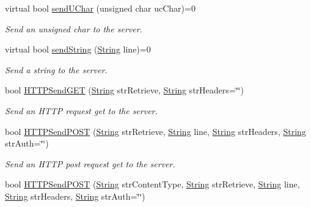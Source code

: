 \begin{DoxyCompactItemize}
virtual bool \mbox{\hyperlink{class_rad_j_a_v_1_1_networking_1_1_tcpip_client_a27e9adfc9d218a82cca52bdbe50c8ebf}{send\+U\+Char}} (unsigned char uc\+Char)=0
\begin{DoxyCompactList}\small\item\em Send an unsigned char to the server. \end{DoxyCompactList}\item 
virtual bool \mbox{\hyperlink{class_rad_j_a_v_1_1_networking_1_1_tcpip_client_abb5360e05cb078ed7cdc42bc70ffc3ab}{send\+String}} (\mbox{\hyperlink{class_rad_j_a_v_1_1_string}{String}} line)=0
\begin{DoxyCompactList}\small\item\em Send a string to the server. \end{DoxyCompactList}\item 
bool \mbox{\hyperlink{class_rad_j_a_v_1_1_networking_1_1_tcpip_client_a91ea7348351c25b23e318088f3dad2a8}{H\+T\+T\+P\+Send\+G\+ET}} (\mbox{\hyperlink{class_rad_j_a_v_1_1_string}{String}} str\+Retrieve, \mbox{\hyperlink{class_rad_j_a_v_1_1_string}{String}} str\+Headers=\char`\"{}\char`\"{})
\begin{DoxyCompactList}\small\item\em Send an H\+T\+TP request get to the server. \end{DoxyCompactList}\item 
bool \mbox{\hyperlink{class_rad_j_a_v_1_1_networking_1_1_tcpip_client_aa4b9f535d3b34da9bcfede602b1b09ef}{H\+T\+T\+P\+Send\+P\+O\+ST}} (\mbox{\hyperlink{class_rad_j_a_v_1_1_string}{String}} str\+Retrieve, \mbox{\hyperlink{class_rad_j_a_v_1_1_string}{String}} line, \mbox{\hyperlink{class_rad_j_a_v_1_1_string}{String}} str\+Headers, \mbox{\hyperlink{class_rad_j_a_v_1_1_string}{String}} str\+Auth=\char`\"{}\char`\"{})
\begin{DoxyCompactList}\small\item\em Send an H\+T\+TP post request get to the server. \end{DoxyCompactList}\item 
bool \mbox{\hyperlink{class_rad_j_a_v_1_1_networking_1_1_tcpip_client_a396c8c2729b10ece40ff82b733a89cc0}{H\+T\+T\+P\+Send\+P\+O\+ST}} (\mbox{\hyperlink{class_rad_j_a_v_1_1_string}{String}} str\+Content\+Type, \mbox{\hyperlink{class_rad_j_a_v_1_1_string}{String}} str\+Retrieve, \mbox{\hyperlink{class_rad_j_a_v_1_1_string}{String}} line, \mbox{\hyperlink{class_rad_j_a_v_1_1_string}{String}} str\+Headers, \mbox{\hyperlink{class_rad_j_a_v_1_1_string}{String}} str\+Auth=\char`\"{}\char`\"{})

\end{DoxyCompactItemize}

